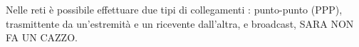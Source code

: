\documentclass{subfiles}
\begin{document}
    Nelle reti è possibile effettuare due tipi di collegamenti : punto-punto (PPP), trasmittente da un'estremità e un ricevente 
    dall'altra, e broadcast,  SARA NON FA UN CAZZO. 
\end{document}
